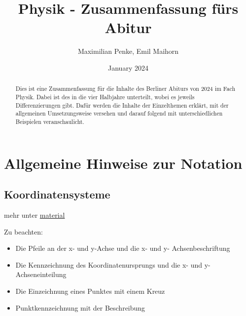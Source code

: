 \documentclass{article}
\title{Physik - Zusammenfassung fürs Abitur}
\author{Maximilian Penke, Emil Maihorn}
\date{January 2024}
\begin{document}
    \maketitle

    \begin{abstract}
        Dies ist eine Zusammenfassung für die Inhalte des Berliner Abiturs von 2024 im Fach Physik. Dabei ist des in die vier Halbjahre unterteilt, wobei es jeweils Differenzierungen gibt. Dafür werden die Inhalte der Einzelthemen erklärt, mit der allgemeinen Umsetzungsweise versehen und darauf folgend mit unterschiedlichen Beispielen veranschaulicht.
    \end{abstract}

    \tableofcontents

    \section{Allgemeine Hinweise zur Notation}

        \subsection{Koordinatensysteme} 
        mehr unter \href{https://gcm.schule/material/2023/physik/lk12/01_Koordinatensysteme_Felder.md}{material}
        
        Zu beachten:
        \begin{itemize}
            \item Die Pfeile an der x- und y-Achse und die x- und y- Achsenbeschriftung
            \item Die Kennzeichnung des Koordinatenursprungs und die x- und y-Achseneinteilung
            \item Die Einzeichnung eines Punktes mit einem Kreuz
            \item Punktkennzeichnung mit der Beschreibung
        \end{itemize}

        \begin{figure}[h]
            \centering
        \end{figure}
\end{document}
